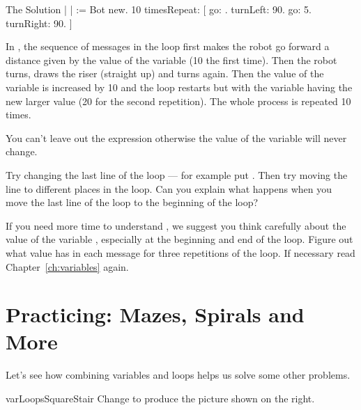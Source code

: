 \begin{scriptwithtitle}{The Solution}\label{src:strangestair}
| \caro {} |
\caro := Bot new.
10 timesRepeat: 
               [ \caro go: .
               \caro turnLeft: 90.
               \caro go: 5.
               \caro turnRight: 90.
                ]
\end{scriptwithtitle}


In   , the sequence of messages in the loop first makes the robot go forward a distance given by the value of the variable  (10 the first time). Then the robot turns, draws the riser (straight up) and turns again.  Then the value of the variable  is increased by 10 and the loop restarts  but with the variable  having the new larger value (20 for the second repetition). The whole process is repeated 10 times.

You can't leave out the expression  otherwise the value of the variable will never change.

\begin{exonofig}
Try changing the last line of the loop --- for example put .  Then try moving the line to different places in the
loop. Can you explain what happens when you move the last line of the
loop to the beginning of the loop?
\end{exonofig}


If you need more time to understand , we suggest you think carefully about the value of the variable  , especially at the beginning and end of the loop. Figure out what value  has in each message for three repetitions of the loop. If necessary read Chapter~\ref{ch:variables} again.

\section{Practicing: Mazes, Spirals and More}

Let's see how combining variables and loops helps us  solve
some other problems.

\begin{exofig}{varLoopsSquareStair}
Change  to produce the picture shown on the right.
\end{exofig}


